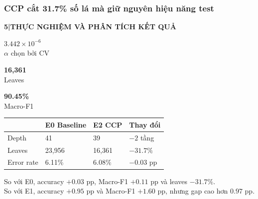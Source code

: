 \documentclass[aspectratio=169,12pt]{beamer}
\newcommand{\metric}[3]{%
  \begin{minipage}[t]{0.30\linewidth}
    \centering
    {\Large\bfseries\textcolor{#1}{#2}}\\[-0.15em]
    {\small #3}
  \end{minipage}%
}
\newcommand{\chaptertag}[2]{%
  \vspace{-0.16cm}%
  {\scriptsize\bfseries\textcolor{boxframe}{#1\enspace |\enspace #2}}\par
  \vspace{0.12cm}%
}
\begin{document}
\begin{frame}
  \frametitle{CCP cắt 31.7\% số lá mà giữ nguyên hiệu năng test}
  \chaptertag{5}{THỰC NGHIỆM VÀ PHÂN TÍCH KẾT QUẢ}
  \vspace{0.10cm}
  \begin{center}
    \metric{boxframe}{$3.442\times10^{-6}$}{$\alpha$ chọn bởi CV}\hfill
    \metric{primaryblue}{16,361}{Leaves}\hfill
    \metric{successgreen}{90.45\%}{Macro-F1}
  \end{center}
  \vspace{0.48cm}
  \small
  \begin{center}
    \begin{tabularx}{0.90\textwidth}{@{}L{3.3cm}C{2.1cm}C{2.1cm}Y@{}}
      \toprule
      & \textbf{E0 Baseline} & \textbf{E2 CCP} & \textbf{Thay đổi} \\
      \midrule
      Depth & 41 & 39 & $-2$ tầng \\
      Leaves & 23,956 & 16,361 & $-31.7\%$ \\
      Error rate & 6.11\% & 6.08\% & $-0.03$ pp \\
      \bottomrule
    \end{tabularx}
  \end{center}
  \par\vspace{0.28cm}
  \centering
  \small
  So với E0, accuracy $+0.03$ pp, Macro-F1 $+0.11$ pp và leaves $-31.7\%$.\\
  So với E1, accuracy $+0.95$ pp và Macro-F1 $+1.60$ pp, nhưng gap cao hơn $0.97$ pp.
\end{frame}
\end{document}
